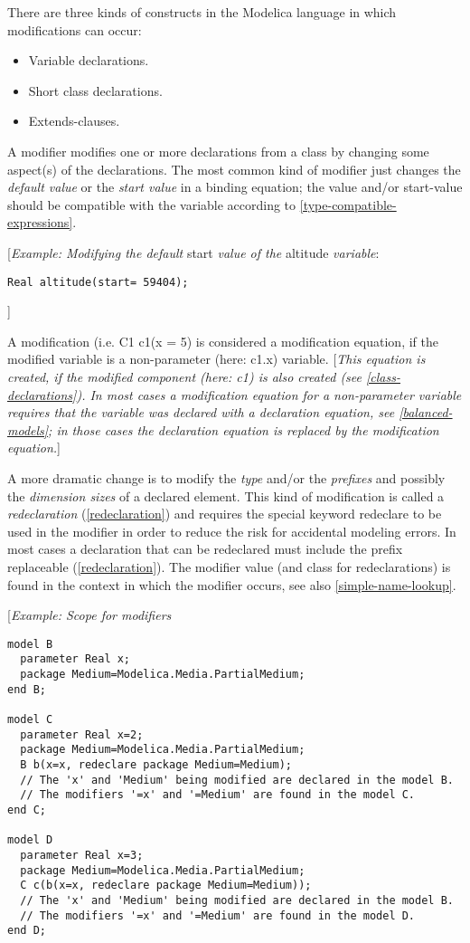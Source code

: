 There are three kinds of constructs in the Modelica language in which
modifications can occur:

\begin{itemize}
\item
  Variable declarations.
\item
  Short class declarations.
\item
  Extends-clauses.
\end{itemize}

A modifier modifies one or more declarations from a class by changing
some aspect(s) of the declarations. The most common kind of modifier
just changes the \emph{default value} or the \emph{start value} in a
binding equation; the value and/or start-value should be compatible with
the variable according to \ref{type-compatible-expressions}.

{[}\emph{Example: Modifying the default} start \emph{value of the}
altitude \emph{variable}:
\begin{lstlisting}[language=modelica]
Real altitude(start= 59404);
\end{lstlisting}
{]}

A modification (i.e. C1 c1(x = 5) is considered a modification equation,
if the modified variable is a non-parameter (here: c1.x) variable.
{[}\emph{This equation is created, if the modified component (here: c1)
is also created (see \ref{class-declarations}). In most cases a
modification equation for a non-parameter variable requires that the
variable was declared with a declaration equation, see \ref{balanced-models};
in those cases the declaration equation is replaced by the
modification equation.}{]}

A more dramatic change is to modify the \emph{type} and/or the
\emph{prefixes} and possibly the \emph{dimension sizes} of a declared
element. This kind of modification is called a \emph{redeclaration}
(\ref{redeclaration}) and requires the special keyword redeclare to be used in
the modifier in order to reduce the risk for accidental modeling errors.
In most cases a declaration that can be redeclared must include the
prefix replaceable (\ref{redeclaration}). The modifier value (and class for
redeclarations) is found in the context in which the modifier occurs,
see also \ref{simple-name-lookup}.

{[}\emph{Example: Scope for modifiers}
\begin{lstlisting}[language=modelica]
model B
  parameter Real x;
  package Medium=Modelica.Media.PartialMedium;
end B;

model C
  parameter Real x=2;
  package Medium=Modelica.Media.PartialMedium;
  B b(x=x, redeclare package Medium=Medium);
  // The 'x' and 'Medium' being modified are declared in the model B.
  // The modifiers '=x' and '=Medium' are found in the model C.
end C;

model D
  parameter Real x=3;
  package Medium=Modelica.Media.PartialMedium;
  C c(b(x=x, redeclare package Medium=Medium));
  // The 'x' and 'Medium' being modified are declared in the model B.
  // The modifiers '=x' and '=Medium' are found in the model D.
end D;
\end{lstlisting}

